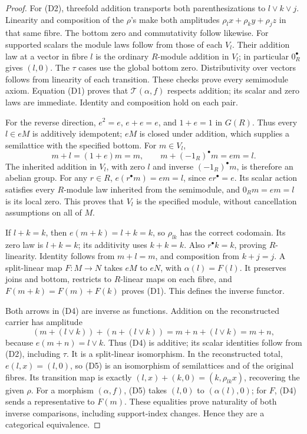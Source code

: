 \begin{proof}
For (D2), threefold addition transports both parenthesizations to
\(l\vee k\vee j\). Linearity and composition of the \(\rho\)'s make
both amplitudes
\(\rho_lx+\rho_ky+\rho_jz\) in that same fibre.
The bottom zero and commutativity follow likewise.
For supported scalars the module laws follow from those of each
\(V_l\). Their addition law at a vector in fibre \(l\) is the
ordinary \(R\)-module addition in \(V_l\); in particular
\(0_R^\bullet\) gives \((l,0)\).
The \(\tau\) cases use the global bottom zero. Distributivity over
vectors follows from linearity of each transition. These checks
prove every semimodule axiom. Equation (D1) proves that
\(\mathcal T(\alpha,f)\) respects addition; its scalar and zero
laws are immediate. Identity and composition hold on each pair.

For the reverse direction, \(e^2=e\), \(e+e=e\), and \(1+e=1\)
in \(G(R)\). Thus every \(l\in eM\) is additively idempotent;
\(eM\) is closed under addition, which supplies a semilattice
with the specified bottom. For \(m\in V_l\),
\[
 m+l=(1+e)m=m,\qquad
 m+(-1_R)^\bullet m=em=l.
\]
The inherited addition in \(V_l\), with zero \(l\) and inverse
\((-1_R)^\bullet m\), is therefore an abelian group.
For any \(r\in R\), \(e(r^\bullet m)=em=l\), since
\(er^\bullet=e\). Its scalar action satisfies every \(R\)-module
law inherited from the semimodule, and \(0_Rm=em=l\)
is its local zero. This proves that \(V_l\) is the specified
module, without cancellation assumptions on all of \(M\).

If \(l+k=k\), then \(e(m+k)=l+k=k\), so \(\rho_{lk}\) has the
correct codomain. Its zero law is \(l+k=k\); its additivity uses
\(k+k=k\). Also \(r^\bullet k=k\), proving \(R\)-linearity.
Identity follows from \(m+l=m\), and composition from \(k+j=j\).
A split-linear map \(F:M\to N\) takes \(eM\) to \(eN\),
with \(\alpha(l)=F(l)\). It preserves joins and bottom, restricts
to \(R\)-linear maps on each fibre, and
\(F(m+k)=F(m)+F(k)\) proves (D1). This defines the inverse functor.

Both arrows in (D4) are inverse as functions. Addition on the
reconstructed carrier has amplitude
\[
 (m+(l\vee k))+(n+(l\vee k))
 =m+n+(l\vee k)=m+n,
\]
because \(e(m+n)=l\vee k\). Thus (D4) is additive; its scalar
identities follow from (D2), including \(\tau\).
It is a split-linear isomorphism. In the reconstructed total,
\(e(l,x)=(l,0)\), so (D5) is an isomorphism of semilattices and
of the original fibres. Its transition map is exactly
\((l,x)+(k,0)=(k,\rho_{lk}x)\), recovering the given \(\rho\).
For a morphism \((\alpha,f)\), (D5) takes \((l,0)\) to
\((\alpha(l),0)\); for \(F\), (D4) sends a representative to
\(F(m)\). These equalities prove naturality of both inverse
comparisons, including support-index changes. Hence they are
a categorical equivalence.
\end{proof}

